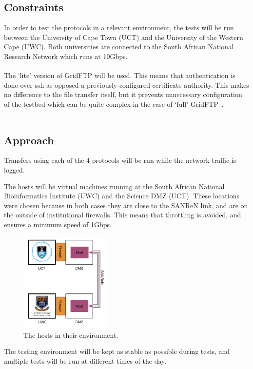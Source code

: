 \documentclass{sig-alternate-05-2015}
\begin{document}
\subsection{Constraints}
In order to test the protocols in a relevant environment, the tests will be run between the University of Cape Town (UCT) and the University of the Western Cape (UWC). Both universities are connected to the South African National Research Network \cite{sanren} which runs at 10Gbps.\\\\
The `lite' version of GridFTP will be used. This means that authentication is done over ssh as opposed a previously-configured certificate authority. This makes no difference to the file transfer itself, but it prevents unnecessary configuration of the testbed which can be quite complex in the case of `full' GridFTP~\cite{gridftplite}.\\\\

\subsection{Approach}
Transfers using each of the 4 protocols will be run while the network traffic is logged.

The hosts will be virtual machines running at the South African National Bioinformatics Institute (UWC) and the Science DMZ (UCT). These locations were chosen because in both cases they are close to the SANReN link, and are on the outside of institutional firewalls. This means that throttling is avoided, and ensures a minimum speed of 1Gbps.
\begin{figure}[H]
	\label{fig:route}
	\centering
	\includegraphics[width=0.4\textwidth]{img/route.png}
	\caption{The hosts in their environment.}
\end{figure}

The testing environment will be kept as stable as possible during tests, and multiple tests will be run at different times of the day.
\end{document}
